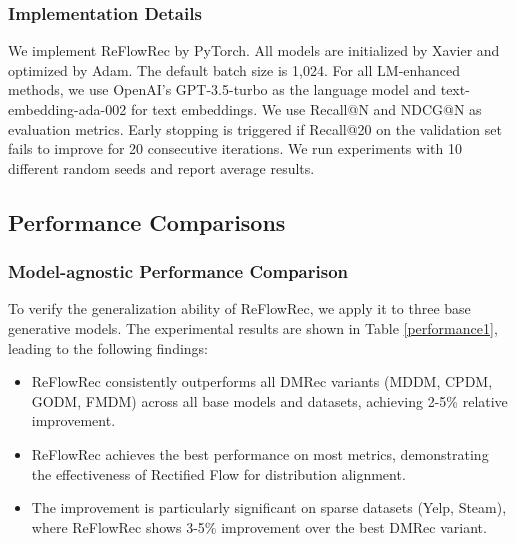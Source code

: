 \documentclass[sigconf]{acmart}
\begin{document}
\subsubsection{\textbf{Implementation Details}} 
We implement \textsf{ReFlowRec} by PyTorch. All models are initialized by Xavier and optimized by Adam. The default batch size is 1,024. For all LM-enhanced methods, we use OpenAI's GPT-3.5-turbo as the language model and text-embedding-ada-002 for text embeddings. We use Recall@N and NDCG@N as evaluation metrics. Early stopping is triggered if Recall@20 on the validation set fails to improve for 20 consecutive iterations. We run experiments with 10 different random seeds and report average results.

\subsection{Performance Comparisons}
\subsubsection{\textbf{Model-agnostic Performance Comparison}}
To verify the generalization ability of \textsf{ReFlowRec}, we apply it to three base generative models. The experimental results are shown in Table \ref{performance1}, leading to the following findings:

\begin{itemize}[leftmargin=*]
    \item \textsf{ReFlowRec} consistently outperforms all DMRec variants (MDDM, CPDM, GODM, FMDM) across all base models and datasets, achieving 2-5\% relative improvement.
    \item \textsf{ReFlowRec} achieves the best performance on most metrics, demonstrating the effectiveness of Rectified Flow for distribution alignment.
    \item The improvement is particularly significant on sparse datasets (Yelp, Steam), where \textsf{ReFlowRec} shows 3-5\% improvement over the best DMRec variant.
\end{itemize}
\end{document}
